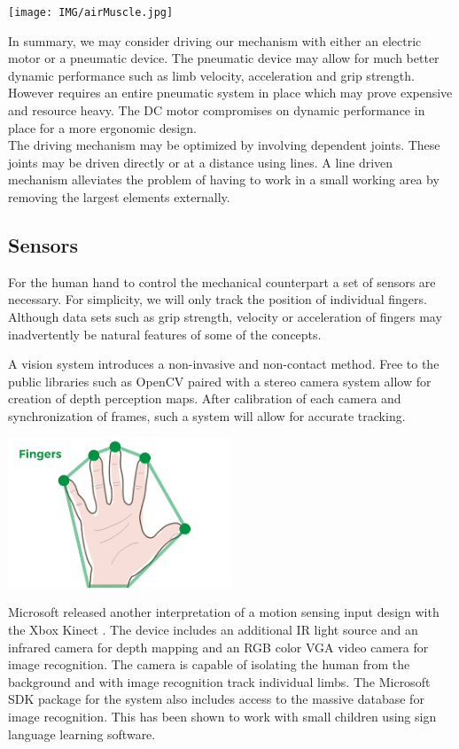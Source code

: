 \documentclass{article}
\begin{document}
\begin{center}
\texttt{[image: IMG/airMuscle.jpg]}
\end{center}

In summary, we may consider driving our mechanism with either an electric motor or a pneumatic device. The pneumatic device may allow for much better dynamic performance such as limb velocity, acceleration and grip strength. However requires an entire pneumatic system in place which may prove expensive and resource heavy. The DC motor compromises on dynamic performance in place for a more ergonomic design.\\[12pt]
\indent The driving mechanism may be optimized by involving dependent joints. These joints may be driven directly or at a distance using lines. A line driven mechanism alleviates the problem of having to work in a small working area by removing the largest elements externally. 

\subsection{Sensors}
For the human hand to control the mechanical counterpart a set of sensors are necessary. For simplicity, we will only track the position of individual fingers. Although data sets such as grip strength, velocity or acceleration of fingers may inadvertently be natural features of some of the concepts.

A vision system introduces a non-invasive and non-contact method. Free to the public libraries such as OpenCV paired with a stereo camera system allow for creation of depth perception maps. After calibration of each camera and synchronization of frames, such a system will allow for accurate tracking.

\begin{center}
\includegraphics[width=0.5\textwidth]{IMG/HandSens.png}
\end{center}

\indent Microsoft released another interpretation of a motion sensing input design with the Xbox Kinect \cite{kinect}. The device includes an additional IR light source and an infrared camera for depth mapping and an RGB color VGA video camera for image recognition. The camera is capable of isolating the human from the background and with image recognition track individual limbs. The Microsoft SDK package for the system also includes access to the massive database for image recognition. This has been shown to work with small children using sign language learning software.
\end{document}
